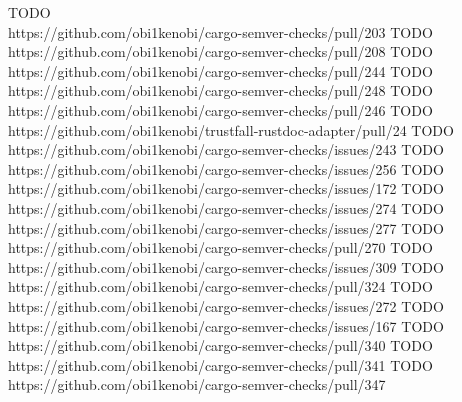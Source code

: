 \documentclass[licencjacka,en]{pracamgr}
\begin{document}
\begin{thebibliography}{99}
 TODO \\ https://github.com/obi1kenobi/cargo-semver-checks/pull/203
 TODO \\ https://github.com/obi1kenobi/cargo-semver-checks/pull/208
 TODO \\ https://github.com/obi1kenobi/cargo-semver-checks/pull/244
 TODO \\ https://github.com/obi1kenobi/cargo-semver-checks/pull/248
 TODO \\ https://github.com/obi1kenobi/cargo-semver-checks/pull/246
 TODO \\ https://github.com/obi1kenobi/trustfall-rustdoc-adapter/pull/24
 TODO \\ https://github.com/obi1kenobi/cargo-semver-checks/issues/243
 TODO \\ https://github.com/obi1kenobi/cargo-semver-checks/issues/256
 TODO \\ https://github.com/obi1kenobi/cargo-semver-checks/issues/172
 TODO \\ https://github.com/obi1kenobi/cargo-semver-checks/issues/274
 TODO \\ https://github.com/obi1kenobi/cargo-semver-checks/issues/277
 TODO \\ https://github.com/obi1kenobi/cargo-semver-checks/pull/270
 TODO \\ https://github.com/obi1kenobi/cargo-semver-checks/issues/309
 TODO \\ https://github.com/obi1kenobi/cargo-semver-checks/pull/324
 TODO \\ https://github.com/obi1kenobi/cargo-semver-checks/issues/272
 TODO \\ https://github.com/obi1kenobi/cargo-semver-checks/issues/167
 TODO \\ https://github.com/obi1kenobi/cargo-semver-checks/pull/340
 TODO \\ https://github.com/obi1kenobi/cargo-semver-checks/pull/341
 TODO \\ https://github.com/obi1kenobi/cargo-semver-checks/pull/347

\end{thebibliography}
\end{document}
